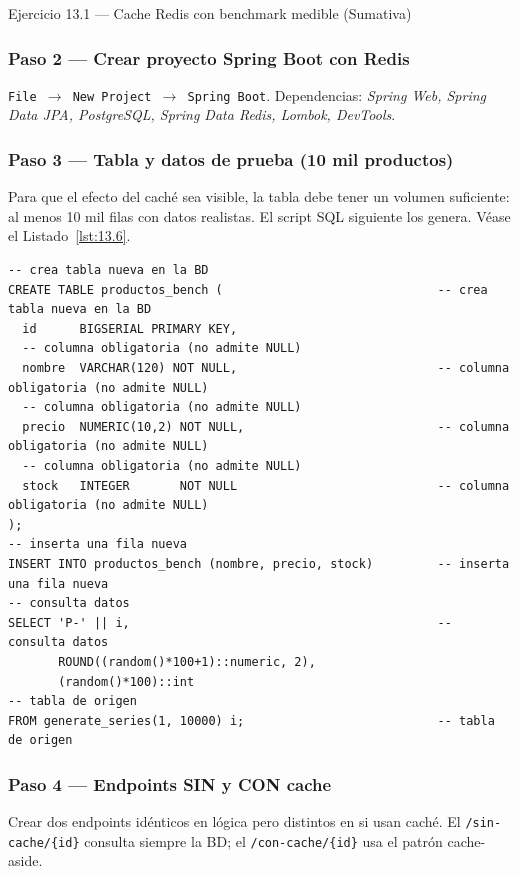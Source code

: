 \documentclass[11pt,a4paper,openany]{book}
\begin{document}
\begin{cajaejercicio}{Ejercicio 13.1 --- Cache Redis con benchmark medible (Sumativa)}
\subsubsection*{Paso 2 --- Crear proyecto Spring Boot con Redis}

\texttt{File $\rightarrow$ New Project $\rightarrow$ Spring Boot}.
Dependencias: \emph{Spring Web, Spring Data JPA, PostgreSQL, Spring
Data Redis, Lombok, DevTools}.

\subsubsection*{Paso 3 --- Tabla y datos de prueba (10 mil productos)}

Para que el efecto del caché sea visible, la tabla debe
tener un volumen suficiente: al menos 10 mil filas con datos
realistas. El script SQL siguiente los genera. V\'ease el Listado~\ref{lst:13.6}.


\begin{lstlisting}[style=sql,numbers=none,caption={Ejemplo de SQL},label=lst:13.6]
-- crea tabla nueva en la BD
CREATE TABLE productos_bench (                              -- crea tabla nueva en la BD
  id      BIGSERIAL PRIMARY KEY,
  -- columna obligatoria (no admite NULL)
  nombre  VARCHAR(120) NOT NULL,                            -- columna obligatoria (no admite NULL)
  -- columna obligatoria (no admite NULL)
  precio  NUMERIC(10,2) NOT NULL,                           -- columna obligatoria (no admite NULL)
  -- columna obligatoria (no admite NULL)
  stock   INTEGER       NOT NULL                            -- columna obligatoria (no admite NULL)
);
-- inserta una fila nueva
INSERT INTO productos_bench (nombre, precio, stock)         -- inserta una fila nueva
-- consulta datos
SELECT 'P-' || i,                                           -- consulta datos
       ROUND((random()*100+1)::numeric, 2),
       (random()*100)::int
-- tabla de origen
FROM generate_series(1, 10000) i;                           -- tabla de origen
\end{lstlisting}

\subsubsection*{Paso 4 --- Endpoints SIN y CON cache}

Crear dos endpoints idénticos en lógica pero distintos en si usan
caché. El \texttt{/sin-cache/\{id\}} consulta siempre la BD; el
\texttt{/con-cache/\{id\}} usa el patrón cache-aside.


\end{cajaejercicio}
\end{document}

